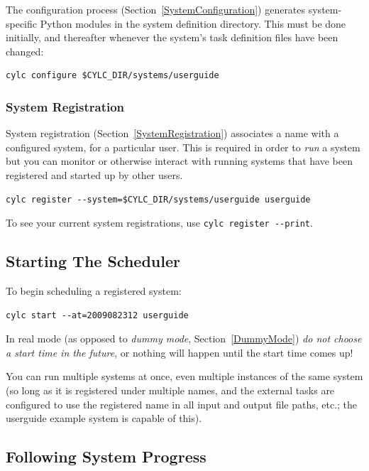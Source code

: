 \documentclass[11pt,a4paper]{article}
\begin{document}
The configuration process (Section~\ref{SystemConfiguration}) generates
system-specific Python modules in the system definition directory. This
must be done initially, and thereafter whenever the system's task
definition files have been changed:

\begin{lstlisting}
cylc configure $CYLC_DIR/systems/userguide
\end{lstlisting}

\subsubsection{System Registration}
\label{QuickRegistration}

System registration (Section~\ref{SystemRegistration}) associates a name
with a configured system, for a particular user. This is required in
order to {\em run} a system but you can monitor or otherwise interact
with running systems that have been registered and started up by other
users.

\begin{lstlisting}
cylc register --system=$CYLC_DIR/systems/userguide userguide 
\end{lstlisting}

To see your current system registrations, use 
\lstinline=cylc register --print=.

\subsection{Starting The Scheduler}
\label{QuickStartingTheScheduler}

To begin scheduling a registered system:
\begin{lstlisting}
cylc start --at=2009082312 userguide
\end{lstlisting}

In real mode (as opposed to {\em dummy mode}, Section~\ref{DummyMode})
{\em do not choose a start time in the future}, or nothing will happen
until the start time comes up!

You can run multiple systems at once, even multiple instances of the
same system (so long as it is registered under multiple names, and the
external tasks are configured to use the registered name in all input
and output file paths, etc.; the userguide example system is capable of
this). 

\subsection{Following System Progress}
\label{QuickFollowingSystemProgress}
\end{document}
